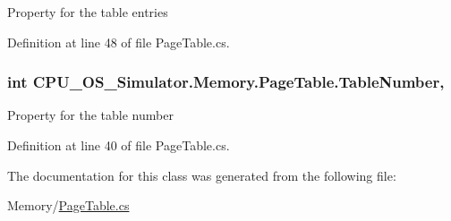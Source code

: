 Property for the table entries 



Definition at line 48 of file Page\+Table.\+cs.

\hypertarget{class_c_p_u___o_s___simulator_1_1_memory_1_1_page_table_a7a30b834bfe4da78dcaa6276b4572c93}{}
\subsubsection[{Table\+Number}]{\setlength{\rightskip}{0pt plus 5cm}int C\+P\+U\+\_\+\+O\+S\+\_\+\+Simulator.\+Memory.\+Page\+Table.\+Table\+Number\hspace{0.3cm}{\ttfamily [get]}, {\ttfamily [set]}}\label{class_c_p_u___o_s___simulator_1_1_memory_1_1_page_table_a7a30b834bfe4da78dcaa6276b4572c93}


Property for the table number 



Definition at line 40 of file Page\+Table.\+cs.



The documentation for this class was generated from the following file\+:\begin{DoxyCompactItemize}
\item 
Memory/\hyperlink{_page_table_8cs}{Page\+Table.\+cs}\end{DoxyCompactItemize}
